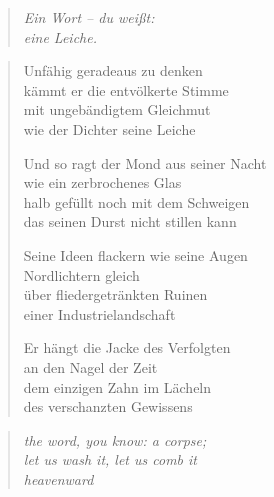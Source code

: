 
\cleartoverso


\begin{quote}
\itshape
Ein Wort -- du weißt:\\
eine Leiche.

\end{quote}

\begin{verse}

Unfähig geradeaus zu denken\\
kämmt er die entvölkerte Stimme\\
mit ungebändigtem Gleichmut\\
wie der Dichter seine Leiche

Und so ragt der Mond aus seiner Nacht\\
wie ein zerbrochenes Glas\\
halb gefüllt noch mit dem Schweigen\\
das seinen Durst nicht stillen kann

Seine Ideen flackern wie seine Augen\\
Nordlichtern gleich\\
über fliedergetränkten Ruinen\\
einer Industrielandschaft

Er hängt die Jacke des Verfolgten\\
an den Nagel der Zeit\\
dem einzigen Zahn im Lächeln\\
des verschanzten Gewissens
\end{verse}

\clearpage


\begin{quote}
\itshape
the word, you know: a corpse;\\
let us wash it, let us comb it\\
heavenward

\end{quote}

